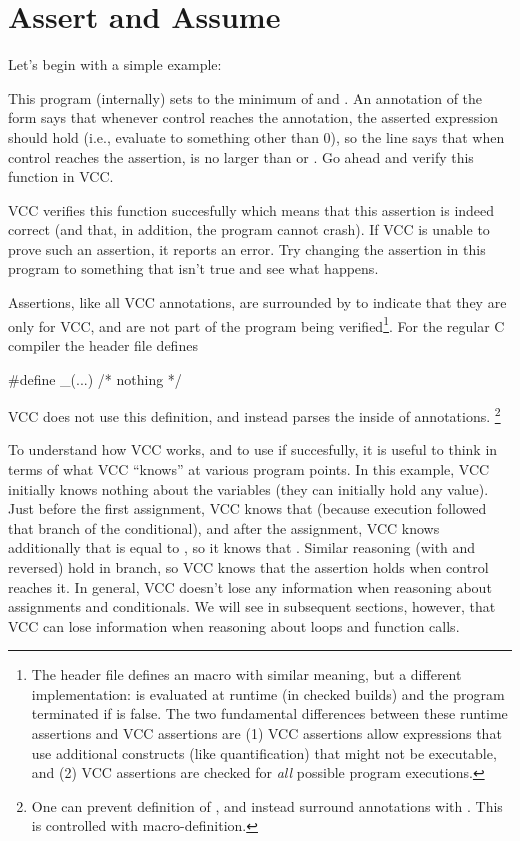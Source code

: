 \section{Assert and Assume}
Let's begin with a simple example:

This program (internally) sets  to the minimum of  and
. An annotation of the form  says that whenever
control reaches the annotation, the asserted expression should hold (i.e.,
evaluate to something other than 0), so the line 
 says that when control reaches the
assertion,  is no larger than  or . Go ahead and
verify this function in VCC. 

VCC verifies this function succesfully which means that this assertion
is indeed correct (and that, in addition, the program cannot
crash). If VCC is unable to prove such an assertion, it reports an
error. Try changing the assertion in this program to something that
isn't true and see what happens.

Assertions, like all VCC annotations, 
are surrounded by  to indicate that they are
only for VCC, and are not part of the program being verified\footnote{
  The  header file defines an  macro
  with similar meaning, but a different implementation: 
   is evaluated at runtime (in checked builds) and
  the program terminated if  is false.  The two fundamental
  differences between these runtime assertions and VCC assertions are
  (1) VCC assertions allow expressions that use additional constructs
  (like quantification) that might not be executable, and (2) VCC
  assertions are checked for \emph{all} possible program executions.}.  
For the regular C compiler the  header file defines
\begin{VCC}
#define _(...) /* nothing */
\end{VCC}
VCC does not use this definition, and instead parses the inside of 
annotations.%
\footnote{
  One can prevent definition of \vcc{_}, and instead surround annotations with
  .
  This is controlled with  macro-definition.}

To understand how VCC works, and to use if succesfully, it is useful to
think in terms of what VCC ``knows'' at various program points. In
this example, VCC initially knows nothing about the variables (they
can initially hold any value). Just before the first assignment, VCC knows that 
 (because execution followed that branch of the conditional), and
after the assignment, VCC knows additionally that  is equal to
, so it knows that . Similar reasoning
(with  and  reversed) hold in  branch, so VCC
knows that the assertion holds when control reaches it. In general,
VCC doesn't lose any information when reasoning about assignments and
conditionals. We will see in subsequent sections, however, that VCC
can lose information when reasoning about loops and function calls.

